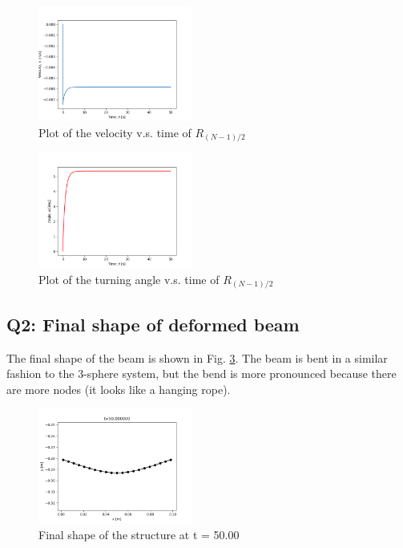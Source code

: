\documentclass[letterpaper, 10 pt, conference]{ieeeconf}  %
\begin{document}
\begin{figure}[!ht]
        \centering
        \includegraphics[width=0.45\textwidth,keepaspectratio]{p2q1_implicit_fallingBeam_velocity.png}
        \caption{Plot of the velocity v.s. time of $R_{(N-1)/2}$}
        \label{"fig:p2q1_velocity"}
\end{figure}

\begin{figure}[!ht]
        \centering
        \includegraphics[width=0.45\textwidth,keepaspectratio]{p2q1_implicit_fallingBeam_angle.png}
        \caption{Plot of the turning angle v.s. time of $R_{(N-1)/2}$}
        \label{"fig:p2q1_angle"}
\end{figure}

\subsection*{Q2: Final shape of deformed beam}

The final shape of the beam is shown in Fig. \ref{"fig:p2q2_final_shape"}. The beam is bent in a similar fashion to the 3-sphere system, but the bend is more pronounced because there are more nodes (it looks like a hanging rope).

\begin{figure}[!ht]
        \centering
        \includegraphics[width=0.45\textwidth,keepaspectratio]{p2q2_implicit_50.00.png}
        \caption{Final shape of the structure at t = 50.00}
        \label{"fig:p2q2_final_shape"}
\end{figure}
\end{document}
